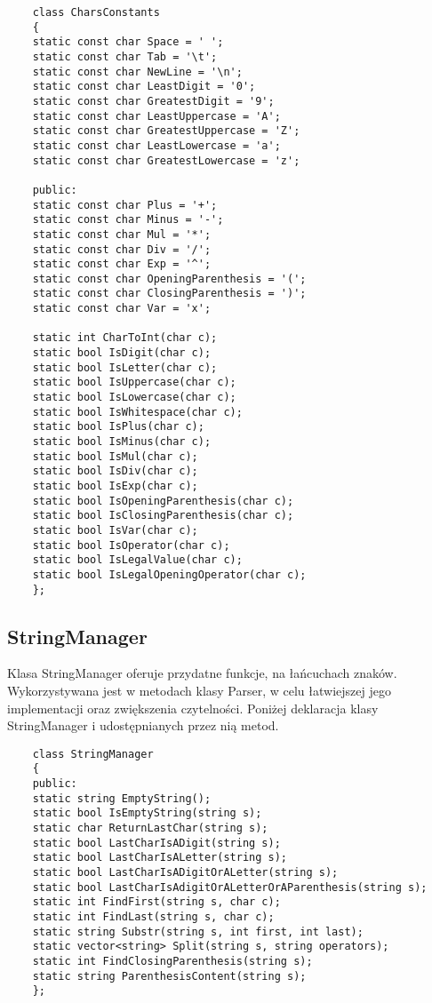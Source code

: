 \documentclass[oneside,a4paper]{book}
\begin{document}
	\begin{lstlisting}
	class CharsConstants
	{
	static const char Space = ' ';
	static const char Tab = '\t';
	static const char NewLine = '\n';
	static const char LeastDigit = '0';
	static const char GreatestDigit = '9';
	static const char LeastUppercase = 'A';
	static const char GreatestUppercase = 'Z';
	static const char LeastLowercase = 'a';
	static const char GreatestLowercase = 'z';
	
	public:
	static const char Plus = '+';
	static const char Minus = '-';
	static const char Mul = '*';
	static const char Div = '/';
	static const char Exp = '^';
	static const char OpeningParenthesis = '(';
	static const char ClosingParenthesis = ')';
	static const char Var = 'x';
	
	static int CharToInt(char c);
	static bool IsDigit(char c);
	static bool IsLetter(char c);
	static bool IsUppercase(char c);
	static bool IsLowercase(char c);
	static bool IsWhitespace(char c);
	static bool IsPlus(char c);
	static bool IsMinus(char c);
	static bool IsMul(char c);
	static bool IsDiv(char c);
	static bool IsExp(char c);
	static bool IsOpeningParenthesis(char c);
	static bool IsClosingParenthesis(char c);
	static bool IsVar(char c);
	static bool IsOperator(char c);
	static bool IsLegalValue(char c);
	static bool IsLegalOpeningOperator(char c);
	};
	\end{lstlisting}
	
	
	\subsection{StringManager}
	
	Klasa StringManager oferuje przydatne funkcje, na łańcuchach znaków. Wykorzystywana jest w metodach klasy Parser, w celu łatwiejszej jego implementacji oraz zwiększenia czytelności. Poniżej deklaracja klasy StringManager i udostępnianych przez nią metod.
	
	\begin{lstlisting}
	class StringManager
	{
	public:
	static string EmptyString();
	static bool IsEmptyString(string s);
	static char ReturnLastChar(string s);
	static bool LastCharIsADigit(string s);
	static bool LastCharIsALetter(string s);
	static bool LastCharIsADigitOrALetter(string s);
	static bool LastCharIsAdigitOrALetterOrAParenthesis(string s);
	static int FindFirst(string s, char c);
	static int FindLast(string s, char c);
	static string Substr(string s, int first, int last);
	static vector<string> Split(string s, string operators);
	static int FindClosingParenthesis(string s);
	static string ParenthesisContent(string s);
	};
	\end{lstlisting}
	
\end{document}
